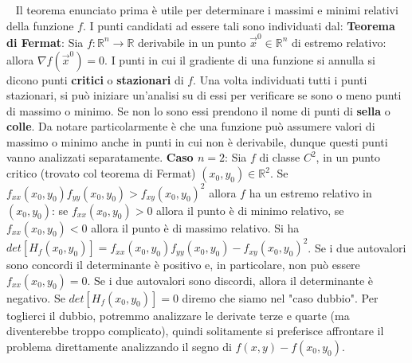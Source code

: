 \ \newline
Il teorema enunciato prima è utile per determinare i massimi e minimi relativi della funzione $f$. I punti candidati ad essere tali sono individuati dal:\newline
\textbf{Teorema di Fermat}: Sia $f: \mathbb{R}^n \rightarrow  \mathbb{R}$ derivabile in un punto $\vec{x}^0 \in \mathbb{R}^n$ di estremo relativo: allora $\nabla f (\vec{x}^0) = 0$.
\newline
\newline
I punti in cui il gradiente di una funzione si annulla si dicono punti \textbf{critici} o \textbf{stazionari} di $f$. Una volta individuati tutti i punti stazionari, si può iniziare un'analisi su di essi per verificare se sono o meno punti di massimo o minimo. Se non lo sono essi prendono il nome di punti di \textbf{sella} o \textbf{colle}. Da notare particolarmente è che una funzione può assumere valori di massimo o minimo anche in punti in cui non è derivabile, dunque questi punti vanno analizzati separatamente.\newline
\newline
\textbf{Caso $n = 2$}:\newline
Sia $f$ di classe $C^2$, in un punto critico (trovato col teorema di Fermat) $(x_0, y_0) \in \mathbb{R}^2$.\newline
Se $f_{xx}(x_0,y_0)f_{yy}(x_0,y_0) > f_{xy}(x_0,y_0)^2$ allora $f$ ha un estremo relativo in $(x_0,y_0)$: se $f_{xx} (x_0,y_0) > 0$ allora il punto è di minimo relativo, se $f_{xx}(x_0,y_0) <0$ allora il punto è di massimo relativo.\newline
Si ha $det[H_f(x_0,y_0)] = f_{xx}(x_0,y_0)f_{yy}(x_0,y_0) - f_{xy}(x_0,y_0)^2$. Se i due autovalori sono concordi il determinante è positivo e, in particolare, non può essere $f_{xx}(x_0,y_0) = 0$. Se i due autovalori sono discordi, allora il determinante è negativo.\newline
Se $det[H_f(x_0,y_0)]= 0$ diremo che siamo nel "caso dubbio". Per toglierci il dubbio, potremmo analizzare le derivate terze e quarte (ma diventerebbe troppo complicato), quindi solitamente si preferisce affrontare il problema direttamente analizzando il segno di $f(x,y)- f(x_0,y_0)$.
